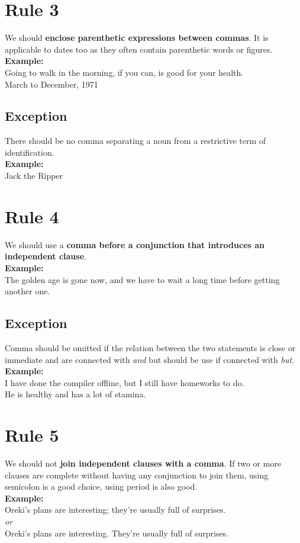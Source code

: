 \documentclass[12pt]{report}
\begin{document}
\section{Rule 3}
We should \textbf{enclose parenthetic expressions between commas}. It is applicable to dates too as they often contain parenthetic words or figures.\\
\textbf{Example:}\\
Going to walk in the morning, if you can, is good for your health.\\
March to December, 1971\\

\subsection{Exception}
There should be no comma separating a noun from a restrictive term of identification.\\
\textbf{Example:}\\
Jack the Ripper


\section{Rule 4}
We should use a \textbf{comma before a conjunction that introduces an independent clause}.\\ \textbf{Example:}\\
The golden age is gone now, and we have to wait a long time before getting another one.
\newpage
\subsection{Exception}
Comma should be omitted if the relation between the two statements is close or immediate and are connected with \textit{and} but should be use if connected with \textit{but}.\\
\textbf{Example:}\\
I have done the compiler offline, but I still have homeworks to do.\\
He is healthy and has a lot of stamina.


\section{Rule 5}
We should not \textbf{join independent clauses with a comma}. If two or more clauses are complete without having any conjunction to join them, using semicolon is a good choice, using period is also good.\\
\textbf{Example:}\\
Oreki's plans are interesting; they're usually full of surprises.\\
\textit{or}\\
Oreki's plans are interesting. They're usually full of surprises.
\end{document}
